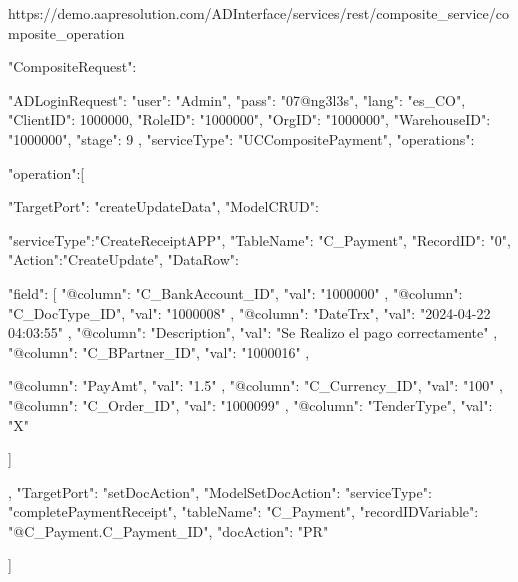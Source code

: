 


https://demo.aapresolution.com/ADInterface/services/rest/composite_service/composite_operation


{

       "CompositeRequest":{
            "ADLoginRequest": {
            "user": "Admin",
            "pass": "07@ng3l3s",
            "lang": "es_CO",
            "ClientID": 1000000,
            "RoleID": "1000000",
            "OrgID": "1000000",
            "WarehouseID": "1000000",
            "stage": 9
        },
          "serviceType": "UCCompositePayment",
              "operations":{
                  "operation":[
                      {
                      "TargetPort": "createUpdateData",
                      "ModelCRUD": {
                          "serviceType":"CreateReceiptAPP",
                          "TableName": "C_Payment",
                          "RecordID": "0",
                          "Action":"CreateUpdate",
                          "DataRow": {
                      "field": [
                    {
                        "@column": "C_BankAccount_ID",
                        "val": "1000000"
                    }, 
                    {
                        "@column": "C_DocType_ID",
                        "val": "1000008"
                    }, 
                    {
                        "@column": "DateTrx",
                        "val": "2024-04-22 04:03:55"
                    },
                      {
                        "@column": "Description",
                        "val": "Se Realizo el pago correctamente"
                    }, 
                       {
                        "@column": "C_BPartner_ID",
                        "val": "1000016"
                    }, 

                     {
                        "@column": "PayAmt",
                        "val": "1.5"
                    }, 
                         {
                        "@column": "C_Currency_ID",
                        "val": "100"
                    }, 
                     {
                        "@column": "C_Order_ID",
                        "val": "1000099"
                    },
                       {
                        "@column": "TenderType",
                        "val": "X"
                    }      
                    
                     ]
                      }

                    }

                    },
                    {
                    "TargetPort": "setDocAction",                      
                    "ModelSetDocAction": {
                        "serviceType": "completePaymentReceipt",
                        "tableName": "C_Payment",
                        "recordIDVariable": "@C_Payment.C_Payment_ID",
                        "docAction": "PR"
                    }
                    }


                  ]
              }

          
    }
}






